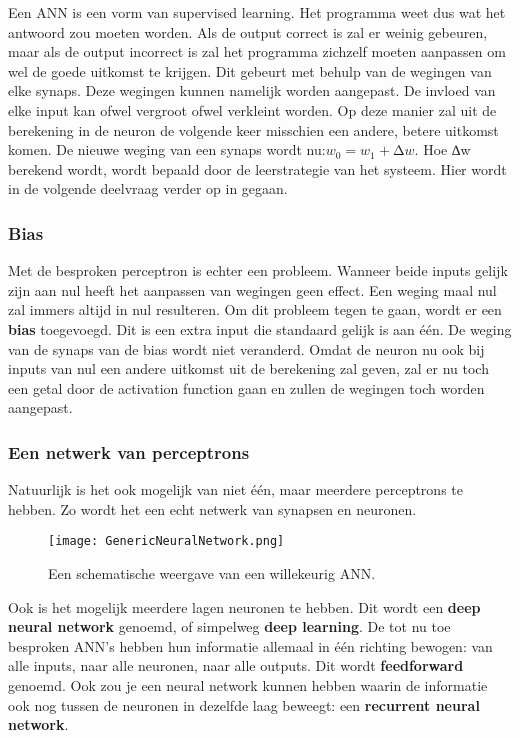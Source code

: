 Een ANN is een vorm van supervised learning. Het programma weet dus wat het antwoord zou moeten worden. Als de output correct is zal er weinig gebeuren, maar als de output incorrect is zal het programma zichzelf moeten aanpassen om wel de goede uitkomst te krijgen. Dit gebeurt met behulp van de wegingen van elke synaps. Deze wegingen kunnen namelijk worden aangepast. De invloed van elke input kan ofwel vergroot ofwel verkleint worden. Op deze manier zal uit de berekening in de neuron de volgende keer misschien een andere, betere uitkomst komen. De nieuwe weging van een synaps wordt nu:$ w_{0} = w_{1} + ∆w $.
Hoe ∆w berekend wordt, wordt bepaald door de leerstrategie van het systeem. Hier wordt in de volgende deelvraag verder op in gegaan.

\subsubsection{Bias}
Met de besproken perceptron is echter een probleem. Wanneer beide inputs gelijk zijn aan nul heeft het aanpassen van wegingen geen effect. Een weging maal nul zal immers altijd in nul resulteren. Om dit probleem tegen te gaan, wordt er een \textbf{bias} toegevoegd. Dit is een extra input die standaard gelijk is aan \'{e}\'{e}n. De weging van de synaps van de bias wordt niet veranderd. Omdat de neuron nu ook bij inputs van nul een andere uitkomst uit de berekening zal geven, zal er nu toch een getal door de activation function gaan en zullen de wegingen toch worden aangepast. 

\subsubsection{Een netwerk van perceptrons}
Natuurlijk is het ook mogelijk van niet \'{e}\'{e}n, maar meerdere perceptrons te hebben. Zo wordt het een echt netwerk van synapsen en neuronen.

\begin{figure}[h]
  \centering
    \texttt{[image: GenericNeuralNetwork.png]}
  \caption{Een schematische weergave van een willekeurig ANN.}
  \label{fig:ANN}
\end{figure}

Ook is het mogelijk meerdere lagen neuronen te hebben. Dit wordt een \textbf{deep neural network} genoemd, of simpelweg \textbf{deep learning}.
De tot nu toe besproken ANN’s hebben hun informatie allemaal in \'{e}\'{e}n richting bewogen: van alle inputs, naar alle neuronen, naar alle outputs. Dit wordt \textbf{feedforward} genoemd. Ook zou je een neural network kunnen hebben waarin de informatie ook nog tussen de neuronen in dezelfde laag beweegt: een \textbf{recurrent neural network}.

